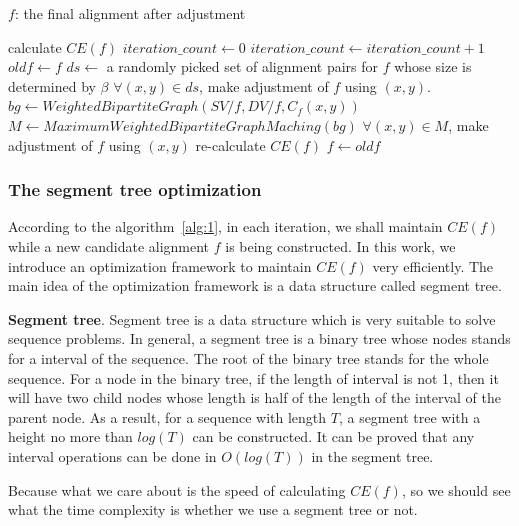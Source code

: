 \documentclass{bioinfo}
\theoremstyle{definition}
\begin{document}
\begin{methods}
\begin{algorithm}[!tpb]
{\begin{algorithmic}[1]
        \Ensure
        $f$: the final alignment after adjustment
        
        \State calculate $CE(f)$
        \State $iteration\_count \gets 0$
            \State $iteration\_count\gets iteration\_count+1$
            \State $oldf\gets f$
            \State $ds\gets$ a randomly picked set of alignment pairs for $f$ whose size is determined by $\beta$
            \State $\forall (x,y)\in ds$, make adjustment of $f$ using $(x,y)$.
            \State $bg\gets WeightedBipartiteGraph(SV/f,DV/f,C_f(x,y))$
            \State $M\gets MaximumWeightedBipartiteGraphMaching(bg)$
            \State $\forall (x,y)\in M$, make adjustment of $f$ using $(x,y)$
            \State re-calculate $CE(f)$
                \State $f\gets oldf$
            \EndIf
        \EndWhile
        \end{algorithmic}    
    }
    \end{algorithm}
\end{methods}

\subsubsection{The segment tree optimization}
According to the algorithm~\ref{alg:1}, in each iteration, we shall maintain $CE(f)$ while a new candidate alignment $f$ is being constructed. In this work, we introduce an optimization framework to maintain $CE(f)$ very efficiently. The main idea of the optimization framework is a data structure called segment tree.

\textbf{Segment tree}. Segment tree is a data structure which is very suitable to solve sequence problems. In general, a segment tree is a binary tree whose nodes stands for a interval of the sequence. The root of the binary tree stands for the whole sequence. For a node in the binary tree, if the length of interval is not 1, then it will have two child nodes whose length is half of the length of the interval of the parent node. As a result, for a sequence with length $T$, a segment tree with a height no more than $log(T)$ can be constructed. It can be proved that any interval operations can be done in $O(log(T))$ in the segment tree.

Because what we care about is the speed of calculating $CE(f)$, so we should see what the time complexity is whether we use a segment tree or not.
\end{document}

